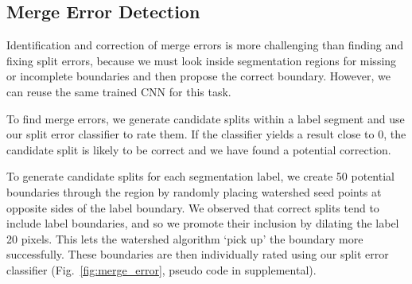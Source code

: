 \subsection{Merge Error Detection}

Identification and correction of merge errors is more challenging than finding and fixing split errors, because we must look inside segmentation regions for missing or incomplete boundaries and then propose the correct boundary. However, we can reuse the same trained CNN for this task. 

To find merge errors, we generate candidate splits within a label segment and use our split error classifier to rate them. 
If the classifier yields a result close to 0, the candidate split is likely to be correct and we have found a potential correction.


To generate candidate splits for each segmentation label, we create 50 potential boundaries through the region by randomly placing watershed seed points at opposite sides of the label boundary.
We observed that correct splits tend to include label boundaries, and so we promote their inclusion by dilating the label 20 pixels. This lets the watershed algorithm `pick up' the boundary more successfully. These boundaries are then individually rated using our split error classifier (Fig.~\ref{fig:merge_error}, pseudo code in supplemental).


